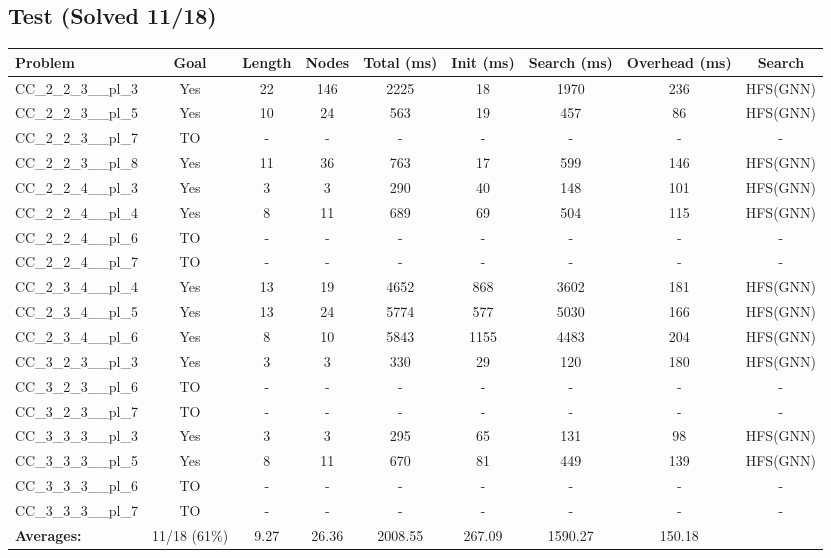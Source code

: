 \documentclass{article}
\begin{document}
\subsection*{Test (Solved 11/18)}
\begin{tabular}{lcccccccc}
\toprule
Problem & Goal & Length & Nodes & Total (ms) & Init (ms) & Search (ms) & Overhead (ms) & Search \\
\midrule
CC\_2\_2\_3\_\_pl\_3 & Yes & 22 & 146 & 2225 & 18 & 1970 & 236 & HFS(GNN) \\
CC\_2\_2\_3\_\_pl\_5 & Yes & 10 & 24 & 563 & 19 & 457 & 86 & HFS(GNN) \\
CC\_2\_2\_3\_\_pl\_7 & TO & - & - & - & - & - & - & - \\
CC\_2\_2\_3\_\_pl\_8 & Yes & 11 & 36 & 763 & 17 & 599 & 146 & HFS(GNN) \\
CC\_2\_2\_4\_\_pl\_3 & Yes & 3 & 3 & 290 & 40 & 148 & 101 & HFS(GNN) \\
CC\_2\_2\_4\_\_pl\_4 & Yes & 8 & 11 & 689 & 69 & 504 & 115 & HFS(GNN) \\
CC\_2\_2\_4\_\_pl\_6 & TO & - & - & - & - & - & - & - \\
CC\_2\_2\_4\_\_pl\_7 & TO & - & - & - & - & - & - & - \\
CC\_2\_3\_4\_\_pl\_4 & Yes & 13 & 19 & 4652 & 868 & 3602 & 181 & HFS(GNN) \\
CC\_2\_3\_4\_\_pl\_5 & Yes & 13 & 24 & 5774 & 577 & 5030 & 166 & HFS(GNN) \\
CC\_2\_3\_4\_\_pl\_6 & Yes & 8 & 10 & 5843 & 1155 & 4483 & 204 & HFS(GNN) \\
CC\_3\_2\_3\_\_pl\_3 & Yes & 3 & 3 & 330 & 29 & 120 & 180 & HFS(GNN) \\
CC\_3\_2\_3\_\_pl\_6 & TO & - & - & - & - & - & - & - \\
CC\_3\_2\_3\_\_pl\_7 & TO & - & - & - & - & - & - & - \\
CC\_3\_3\_3\_\_pl\_3 & Yes & 3 & 3 & 295 & 65 & 131 & 98 & HFS(GNN) \\
CC\_3\_3\_3\_\_pl\_5 & Yes & 8 & 11 & 670 & 81 & 449 & 139 & HFS(GNN) \\
CC\_3\_3\_3\_\_pl\_6 & TO & - & - & - & - & - & - & - \\
CC\_3\_3\_3\_\_pl\_7 & TO & - & - & - & - & - & - & - \\
\textbf{Averages:} & 11/18 (61\%) & 9.27 & 26.36 & 2008.55 & 267.09 & 1590.27 & 150.18 & \\
\bottomrule
\end{tabular}
\\[0.7cm]
\end{document}
